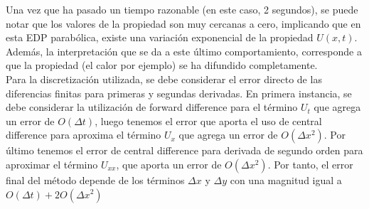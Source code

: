 \documentclass[letterpaper]{article}
\newcommand{\5}
{
\\[.5cm]
}
\begin{document}
\begin{itemize}
Una vez que ha pasado un tiempo razonable (en este caso, 2 segundos), se puede notar que los valores de la propiedad son muy cercanas a cero, implicando que en esta EDP parabólica, existe una variación exponencial de la propiedad $U(x, t)$. Además, la interpretación que se da a este último comportamiento, corresponde a que la propiedad (el calor por ejemplo) se ha difundido completamente. \\[0.2cm]
Para la discretización utilizada, se debe considerar el error directo de las diferencias finitas para primeras y segundas derivadas. En primera instancia, se debe considerar la utilización de forward difference para el término $U_t$ que agrega un error de $O(\Delta t)$, luego tenemos el error que aporta el uso de central difference para aproxima el término $U_x$ que agrega un error de $O(\Delta x^2)$. Por último tenemos el error de central difference para derivada de segundo orden para aproximar el término $U_{xx}$, que aporta un error de $O(\Delta x^2)$. Por tanto, el error final del método depende de los términos $\Delta x$ y $\Delta y$ con una magnitud igual a $O(\Delta t) + 2O(\Delta x^2)$
\end{itemize}
\end{document}

